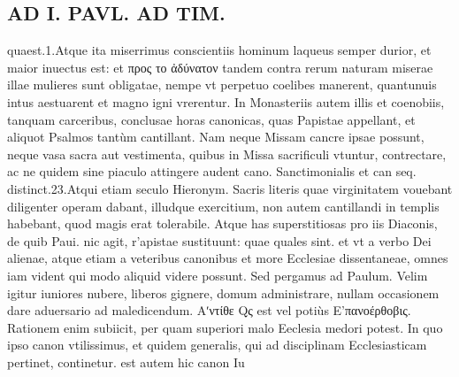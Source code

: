 \documentclass{article}
\begin{document}
\begin{pages}
\section*{AD I. PAVL. AD TIM. }
\marginpar{[ p.296 ]}\pstart quaest.1.Atque ita miserrimus conscientiis hominum laqueus semper durior, et maior inuectus est: et προς το ἀδύνατον tandem contra rerum naturam miserae illae mulieres sunt obligatae, nempe vt perpetuo coelibes manerent, quantunuis intus aestuarent et magno igni vrerentur.  \pend\pstart In Monasteriis autem illis et coenobiis, tanquam carceribus, conclusae horas canonicas, quas Papistae appellant, et aliquot Psalmos tantùm cantillant. Nam neque  Missam cancre ipsae possunt, neque vasa sacra aut vestimenta, quibus in Missa sacrificuli vtuntur, contrectare, ac ne quidem sine piaculo attingere audent cano. Sanctimonialis et can seq. distinct.23.Atqui etiam seculo Hieronym. Sacris literis quae virginitatem vouebant diligenter operam dabant, illudque exercitium, non autem cantillandi in templis habebant, quod magis erat tolerabile. Atque has superstitiosas pro iis Diaconis, de quib Paui. nic agit, r’apistae sustituunt: quae quales sint. et vt a verbo Dei alienae, atque etiam a veteribus canonibus et more Ecclesiae dissentaneae, omnes iam vident qui modo aliquid videre possunt. Sed pergamus ad Paulum.  \pend{} Velim igitur iuniores nubere, liberos gignere, domum administrare, nullam occasionem dare aduersario ad maledicendum.  \pend\pstart Αʹντίθε Qς est vel potiùs Ε’πανοέρθοβις. Rationem enim subiicit, per quam superiori malo Eeclesia medori potest. In quo ipso canon vtilissimus, et quidem generalis, qui ad disciplinam Ecclesiasticam pertinet, continetur. est autem hic canon Iu\pend

\end{pages}
\end{document}
